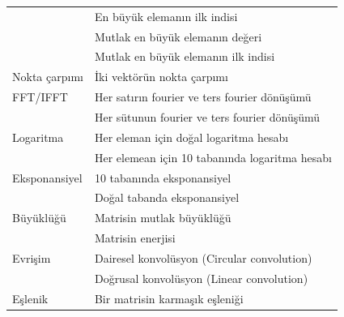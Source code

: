 \begin{longtable}{p{80pt} p{250pt}}
 												& En büyük elemanın ilk indisi																\\%
 												& Mutlak en büyük elemanın değeri															\\%
 												& Mutlak en büyük elemanın ilk indisi													\\%
 Nokta çarpımı					& İki vektörün nokta çarpımı																	\\%
 FFT/IFFT								& Her satırın fourier ve ters fourier dönüşümü								\\%
 												& Her sütunun fourier ve ters fourier dönüşümü								\\%
 Logaritma							& Her eleman için doğal logaritma hesabı											\\%
 												& Her elemean için 10 tabanında logaritma hesabı							\\%
 Eksponansiyel					& 10 tabanında eksponansiyel 																	\\%
 												& Doğal tabanda eksponansiyel 																\\%
 Büyüklüğü  						& Matrisin mutlak büyüklüğü																		\\%
 												& Matrisin enerjisi																						\\%
 Evrişim 								& Dairesel konvolüsyon (Circular convolution)									\\%
 												& Doğrusal konvolüsyon (Linear convolution) 									\\%
 Eşlenik     						&	Bir matrisin karmaşık eşleniği															\\%

\end{longtable}
